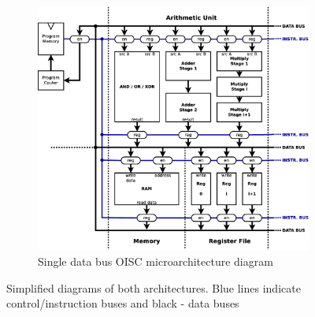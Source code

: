 \documentclass[a4paper,12pt]{article}
\begin{document}
\begin{multicols}{2}
\begin{figure}[h!]
	\begin{subfigure}[b]{1\textwidth}
		\includegraphics[width=\linewidth]{graphics/oisc.eps}
		\caption{Single data bus OISC microarchitecture diagram}
		\label{fig:oisc_simple}
	\end{subfigure}
	
	\caption{Simplified diagrams of both architectures. Blue lines indicate control/instruction buses and black - data buses}
	\label{fig:simple_blocks}
\end{figure}

\end{multicols}
\newpage
\end{document}

